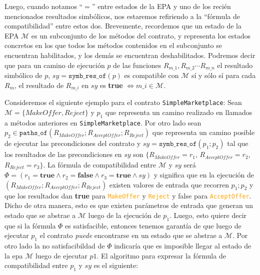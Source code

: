 Luego, cuando notamos ``$=$'' entre estados de la EPA y uno de los recién mencionados resultados simbólicos, nos estaremos refiriendo a la ``fórmula de compatibilidad'' entre estos dos.
Brevemente, recordemos que un estado de la EPA $\mathcal{M}$ es un subconjunto de los métodos del contrato, y representa los estados concretos en los que todos los métodos contenidos en el subconjunto se encuentran habilitados, y los demás se encuentran deshabilitados.
Podremos decir que para un camino de ejecución $p$ de las funciones $R_{m\_1},R_{m\_2} \cdots R_{m\_n}$ el resultado simbólico de $p$, $sy = \texttt{symb\_res\_of}(p)$ es compatible con $\mathcal{M}$ sí y sólo sí para cada $R_m$, el resultado de $R_{m\_i}$ en $sy$ es \textbf{true} $\iff m\_i \in \mathcal{M}$.

Consideremos el siguiente ejemplo para el contrato \texttt{SimpleMarketplace}:
Sean $\mathcal{M} = \{MakeOffer, Reject\}$ y $p_1$ que representa un camino realizado en llamados a métodos anteriores en \texttt{SimpleMarketplace}.
Por otro lado sean $p_2 \in \texttt{paths\_of}(R_{MakeOffer}; R_{AcceptOffer}; R_{Reject})$ que representa un camino posible de ejecutar las precondiciones del contrato y $sy = \texttt{symb\_res\_of}(p_1;p_2)$ tal que los resultados de las precondiciones en $sy$ son $\{R_{MakeOffer} = r_1$, $R_{AcceptOffer} = r_2$, $R_{Reject} = r_3\}$.
La fórmula de compatibilidad entre $\mathcal{M}$ y $sy$ será $\Phi = (r_1 = \textbf{true} \land r_2 = \textbf{false} \land r_3 = \textbf{true} \land sy)$ y significa que en la ejecución de $(R_{MakeOffer}; R_{AcceptOffer}; R_{Reject})$ existen valores de entrada que recorren $p_1;p_2$ y que los resultados dan \textbf{true} para \textcolor{orange}{\texttt{MakeOffer}} y \textcolor{orange}{\texttt{Reject}} y false para \textcolor{orange}{\texttt{AcceptOffer}}.
Dicho de otra manera, esto es que existen parámetros de entrada que generan un estado que se abstrae a $\mathcal{M}$ luego de la ejecución de $p_1$.
Luego, esto quiere decir que si la fórmula $\Phi$ es satisfacible, entonces tenemos garantía de que luego de ejecutar $p_1$ el contrato \textit{puede} encontrarse en un estado que se abstrae a $\mathcal{M}$.
Por otro lado la no satisfacibildad de $\Phi$ indicaría que es imposible llegar al estado de la epa $\mathcal{M}$ luego de ejecutar $p1$.
El algoritmo para expresar la fórmula de compatibilidad entre $p_1$ y $sy$ es el siguiente:

